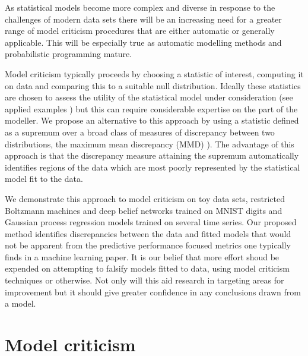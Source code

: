 As statistical models become more complex and diverse in response to the challenges of modern data sets there will be an increasing need for a greater range of model criticism procedures that are either automatic or generally applicable.
This will be especially true as automatic modelling methods \citep[e.g.][]{Grosse2012-zi, Thornton2013-zg, Lloyd2014-nz} and probabilistic programming \citep[e.g.][]{Milch2005-qc, Goodman2008-ok, Stan_Development_Team2014-ha} mature.

Model criticism typically proceeds by choosing a statistic of interest, computing it on data and comparing this to a suitable null distribution.
Ideally these statistics are chosen to assess the utility of the statistical model under consideration (see applied examples \citep[e.g.][]{Meulders1998-xo, Gelman2013-st}) but this can require considerable expertise on the part of the modeller.
We propose an alternative to this approach by using a statistic defined as a supremum over a broad class of measures of discrepancy between two distributions, the maximum mean discrepancy (MMD) \citep[e.g.][]{Borgwardt2006-gy, Gretton2007-ft, Gretton2008-gs}).
The advantage of this approach is that the discrepancy measure attaining the supremum automatically identifies regions of the data which are most poorly represented by the statistical model fit to the data.

We demonstrate this approach to model criticism on toy data sets, restricted Boltzmann machines and deep belief networks trained on MNIST digits and Gaussian process \citep[e.g.][]{Rasmussen2006-ml} regression models trained on several time series.
Our proposed method identifies discrepancies between the data and fitted models that would not be apparent from the predictive performance focused metrics one typically finds in a machine learning paper.
It is our belief that more effort shoud be expended on attempting to falsify models fitted to data, using model criticism techniques or otherwise.
Not only will this aid research in targeting areas for improvement but it should give greater confidence in any conclusions drawn from a model.

\section{Model criticism}
\label{sec:model-crit-general}

